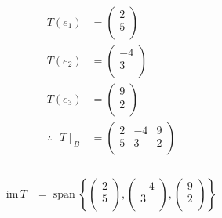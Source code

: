 \documentclass[fleqn, a4paper, twocolumn, draft]{article}
\DeclareMathOperator{\vspan}{\mathrm{span}} %
\theoremstyle{definition}
\theoremstyle{theorem}
\theoremstyle{remark}
\newcommand{\im}{\mathrm{im}\,}
\numberwithin{corollary}{theorem}
\numberwithin{equation}{theorem}
\begin{document}
\subsubsection{}

\begin{align*}
	T(e_1) &=
		\begin{pmatrix}
			2\\
			5\\
		\end{pmatrix}\\
	T(e_2) &=
		\begin{pmatrix}
			-4\\
			3\\
		\end{pmatrix}\\
	T(e_3) &=
		\begin{pmatrix}
			9\\
			2\\
		\end{pmatrix}\\
	\therefore [T]_B &= 
		\begin{pmatrix}
			2 & -4 & 9\\
			5 & 3 & 2\\
		\end{pmatrix}
\end{align*}

\subsubsection{}

\begin{align*}
	\im T &= \vspan
		\left\lbrace
			\begin{pmatrix}
				2\\
				5\\
			\end{pmatrix}
			,
			\begin{pmatrix}
				-4\\
				3\\
			\end{pmatrix}
			,
			\begin{pmatrix}
			9\\
			2\\
			\end{pmatrix}
		\right\rbrace
\end{align*}

\subsubsection{}
\end{document}
